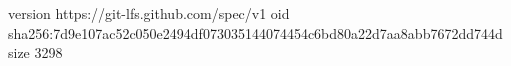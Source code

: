 version https://git-lfs.github.com/spec/v1
oid sha256:7d9e107ac52c050e2494df073035144074454c6bd80a22d7aa8abb7672dd744d
size 3298
